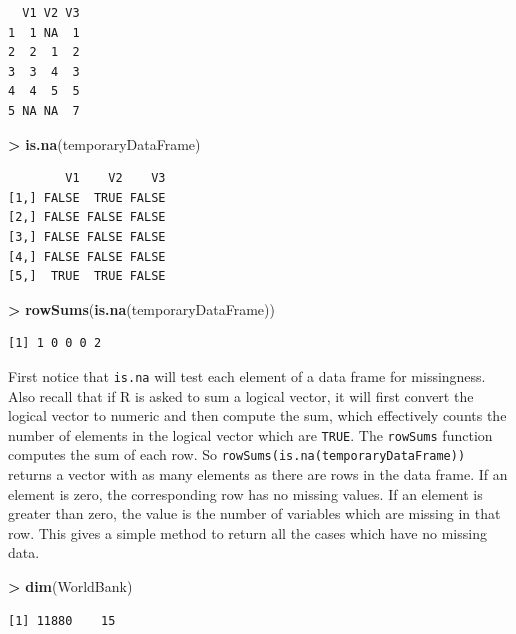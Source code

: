 \documentclass[
]{krantz}
\makeatletter
\newenvironment{Shaded}{\begin{snugshade}}{\end{snugshade}}
\newcommand{\KeywordTok}[1]{\textcolor[rgb]{0.27,0.27,0.27}{\textbf{#1}}}
\newcommand{\NormalTok}[1]{#1}
\newcommand{\OperatorTok}[1]{\textcolor[rgb]{0.43,0.43,0.43}{\textbf{#1}}}
\newcommand{\StringTok}[1]{\textcolor[rgb]{0.5,0.5,0.5}{#1}}
\newenvironment{kframe}{%
\medskip{}
\setlength{\fboxsep}{.8em}
 \def\at@end@of@kframe{}%
 \ifinner\ifhmode%
  \def\at@end@of@kframe{\end{minipage}}%
  \begin{minipage}{\columnwidth}%
 \fi\fi%
 \def\FrameCommand##1{\hskip\@totalleftmargin \hskip-\fboxsep
 \colorbox{shadecolor}{##1}\hskip-\fboxsep
     \hskip-\linewidth \hskip-\@totalleftmargin \hskip\columnwidth}%
 \MakeFramed {\advance\hsize-\width
   \@totalleftmargin\z@ \linewidth\hsize
   \@setminipage}}%
 {\par\unskip\endMakeFramed%
 \at@end@of@kframe}
\renewenvironment{Shaded}{\begin{kframe}}{\end{kframe}}
\makeatother
\begin{document}
\begin{verbatim}
  V1 V2 V3
1  1 NA  1
2  2  1  2
3  3  4  3
4  4  5  5
5 NA NA  7
\end{verbatim}

\begin{Shaded}
\begin{Highlighting}[]
\OperatorTok{\textgreater{}}\StringTok{ }\KeywordTok{is.na}\NormalTok{(temporaryDataFrame)}
\end{Highlighting}
\end{Shaded}

\begin{verbatim}
        V1    V2    V3
[1,] FALSE  TRUE FALSE
[2,] FALSE FALSE FALSE
[3,] FALSE FALSE FALSE
[4,] FALSE FALSE FALSE
[5,]  TRUE  TRUE FALSE
\end{verbatim}

\begin{Shaded}
\begin{Highlighting}[]
\OperatorTok{\textgreater{}}\StringTok{ }\KeywordTok{rowSums}\NormalTok{(}\KeywordTok{is.na}\NormalTok{(temporaryDataFrame))}
\end{Highlighting}
\end{Shaded}

\begin{verbatim}
[1] 1 0 0 0 2
\end{verbatim}

First notice that \texttt{is.na} will test each element of a data frame for missingness. Also recall that if R is asked to sum a logical vector, it will first convert the logical vector to numeric and then compute the sum, which effectively counts the number of elements in the logical vector which are \texttt{TRUE}. The \texttt{rowSums} function computes the sum of each row. So \texttt{rowSums(is.na(temporaryDataFrame))} returns a vector with as many elements as there are rows in the data frame. If an element is zero, the corresponding row has no missing values. If an element is greater than zero, the value is the number of variables which are missing in that row. This gives a simple method to return all the cases which have no missing data.

\begin{Shaded}
\begin{Highlighting}[]
\OperatorTok{\textgreater{}}\StringTok{ }\KeywordTok{dim}\NormalTok{(WorldBank)}
\end{Highlighting}
\end{Shaded}

\begin{verbatim}
[1] 11880    15
\end{verbatim}
\end{document}
